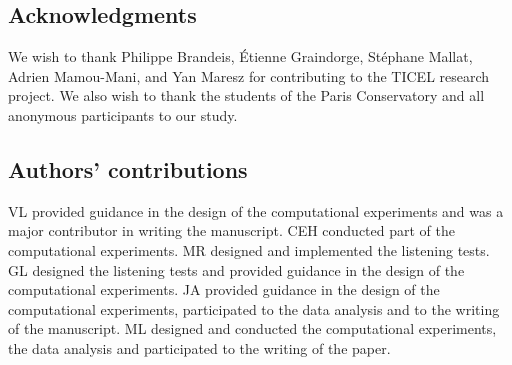 \documentclass{bmcart}
\newcommand{\nmu}{}
\begin{document}
\begin{backmatter}
\subsection*{\nmu Acknowledgments}

We wish to thank Philippe Brandeis, \'{E}tienne Graindorge, St\'{e}phane Mallat, Adrien Mamou-Mani, and Yan Maresz for contributing to the TICEL research project.
We also wish to thank the students of the Paris Conservatory and all anonymous participants to our study.

\subsection*{Authors' contributions}

VL provided guidance in the design of the computational experiments and was a major contributor in writing the manuscript. CEH conducted part of the computational experiments. MR designed and implemented the listening tests. GL designed the listening tests and provided guidance in the design of the computational experiments. JA provided guidance in the design of the computational experiments, participated to the data analysis and  to the writing of the manuscript. ML designed and conducted the computational experiments, the data analysis and participated to the writing of the paper.








\end{backmatter}
\end{document}
